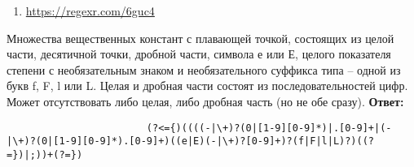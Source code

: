 \documentclass[]{article}
\begin{document}
\begin{enumerate}
\begin{item}
\begin{enumerate}
\begin{item}
\begin{enumerate}
                \begin{item}
                    \begin{itemize}
                        \item \lstinline|{Imposter420} $\Rightarrow$ Imposter420|
                        \item \lstinline|{_420ImPoster} $\Rightarrow$ _420ImPoster|
                        \item \lstinline|{__imposter} $\Rightarrow$ $\varepsilon$|
                        \item \lstinline|{420ImPoster} $\Rightarrow$ $\varepsilon$|
                        \item \lstinline|{Imp@ster} $\Rightarrow$ $\varepsilon$|
                        \item \lstinline|{Imposter420;_420ImPoster;coolGuy} $\Rightarrow$ Imposter420;_420ImPoster;coolGuy|
                        \item \lstinline|{_420ImPoster;__imp@sSt3r} $\Rightarrow$ $\varepsilon$|
                        \item \lstinline|{_} $\Rightarrow$ $\varepsilon$|
                        \item \lstinline|Imposter420 $\Rightarrow$ $\varepsilon$|
                    \end{itemize}
                \end{item}

                \item \url{https://regexr.com/6guc4}

            \end{enumerate}
        \end{item}

        \begin{item}
            Множества вещественных констант с плавающей точкой, состоящих из целой части, десятичной точки, дробной части, символа е или Е, целого показателя степени с необязательным знаком и необязательного суффикса типа – одной из букв f, F, l или L. Целая и дробная части состоят из последовательностей цифр. Может отсутствовать либо целая, либо дробная часть (но не обе сразу).
            \bigbreak
            \textbf{Ответ:}
            \begin{enumerate}

                \begin{item}
                    \begin{lstlisting}
                        (?<={)((((-|\+)?(0|[1-9][0-9]*)|.[0-9]+|(-|\+)?(0|[1-9][0-9]*).[0-9]+)((e|E)(-|\+)?[0-9]+)?(f|F|l|L)?)((?=})|;))+(?=})
                    \end{lstlisting}
                \end{item}


\end{enumerate}
\end{item}
\end{enumerate}
\end{item}
\end{enumerate}
\end{document}
